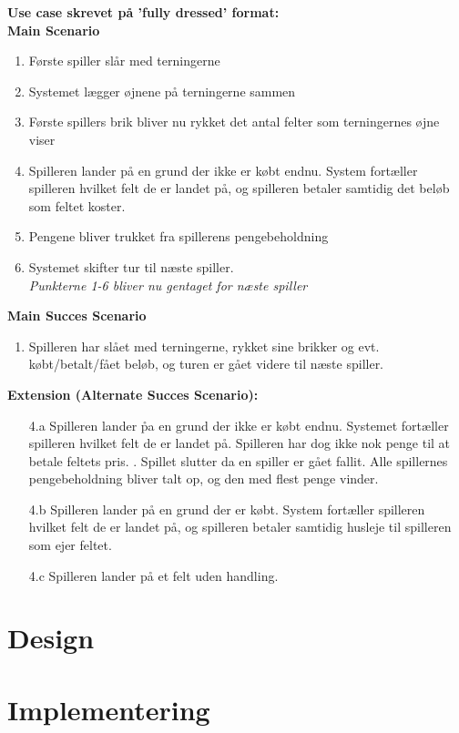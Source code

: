 \documentclass{article}
\begin{document}
\textbf{Use case skrevet på 'fully dressed' format:}\\


\textbf{Main Scenario}
\begin{enumerate}
\itemsep-0.5em
    \item Første spiller slår med terningerne
    \item Systemet lægger øjnene på terningerne sammen
    \item Første spillers brik bliver nu rykket det antal felter som terningernes øjne viser
    \item Spilleren lander på en grund der ikke er købt endnu. System fortæller spilleren hvilket felt de er landet på, og spilleren betaler samtidig det beløb som feltet koster.
    \item Pengene bliver trukket fra spillerens pengebeholdning
    \item Systemet skifter tur til næste spiller.\\
    \textit{Punkterne 1-6 bliver nu gentaget for næste spiller}
\end{enumerate}
\textbf{Main Succes Scenario}
\begin{enumerate}
\itemsep-0.5em
    \item Spilleren har slået med terningerne, rykket sine brikker og evt. købt/betalt/fået beløb, og turen er gået videre til næste spiller. 
\end{enumerate}
\textbf{Extension (Alternate Succes Scenario): }
\begin{enumerate}
    \item [4.a] Spilleren lander p̊a en grund der ikke er købt endnu. Systemet fortæller spilleren hvilket felt de er landet på. Spilleren har dog ikke nok penge til at betale feltets pris.
    . Spillet slutter da en spiller er gået fallit. Alle spillernes pengebeholdning bliver talt op, og den med flest penge vinder.
    \item [4.b] Spilleren lander på en grund der er købt. System fortæller spilleren hvilket felt de er landet på, og spilleren betaler samtidig husleje til spilleren som ejer feltet.
    \item [4.c] Spilleren lander på et felt uden handling.
\end{enumerate}

\section{Design}

\section{Implementering}
\end{document}
